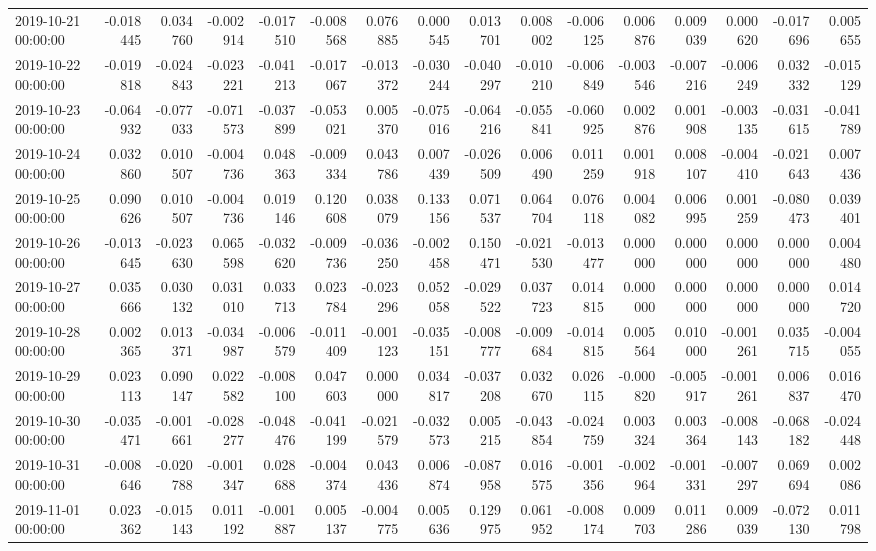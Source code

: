 \begin{tabular}{lrrrrrrrrrrrrrrr}
2019-10-21 00:00:00 & -0.018445 & 0.034760 & -0.002914 & -0.017510 & -0.008568 & 0.076885 & 0.000545 & 0.013701 & 0.008002 & -0.006125 & 0.006876 & 0.009039 & 0.000620 & -0.017696 & 0.005655 \\
2019-10-22 00:00:00 & -0.019818 & -0.024843 & -0.023221 & -0.041213 & -0.017067 & -0.013372 & -0.030244 & -0.040297 & -0.010210 & -0.006849 & -0.003546 & -0.007216 & -0.006249 & 0.032332 & -0.015129 \\
2019-10-23 00:00:00 & -0.064932 & -0.077033 & -0.071573 & -0.037899 & -0.053021 & 0.005370 & -0.075016 & -0.064216 & -0.055841 & -0.060925 & 0.002876 & 0.001908 & -0.003135 & -0.031615 & -0.041789 \\
2019-10-24 00:00:00 & 0.032860 & 0.010507 & -0.004736 & 0.048363 & -0.009334 & 0.043786 & 0.007439 & -0.026509 & 0.006490 & 0.011259 & 0.001918 & 0.008107 & -0.004410 & -0.021643 & 0.007436 \\
2019-10-25 00:00:00 & 0.090626 & 0.010507 & -0.004736 & 0.019146 & 0.120608 & 0.038079 & 0.133156 & 0.071537 & 0.064704 & 0.076118 & 0.004082 & 0.006995 & 0.001259 & -0.080473 & 0.039401 \\
2019-10-26 00:00:00 & -0.013645 & -0.023630 & 0.065598 & -0.032620 & -0.009736 & -0.036250 & -0.002458 & 0.150471 & -0.021530 & -0.013477 & 0.000000 & 0.000000 & 0.000000 & 0.000000 & 0.004480 \\
2019-10-27 00:00:00 & 0.035666 & 0.030132 & 0.031010 & 0.033713 & 0.023784 & -0.023296 & 0.052058 & -0.029522 & 0.037723 & 0.014815 & 0.000000 & 0.000000 & 0.000000 & 0.000000 & 0.014720 \\
2019-10-28 00:00:00 & 0.002365 & 0.013371 & -0.034987 & -0.006579 & -0.011409 & -0.001123 & -0.035151 & -0.008777 & -0.009684 & -0.014815 & 0.005564 & 0.010000 & -0.001261 & 0.035715 & -0.004055 \\
2019-10-29 00:00:00 & 0.023113 & 0.090147 & 0.022582 & -0.008100 & 0.047603 & 0.000000 & 0.034817 & -0.037208 & 0.032670 & 0.026115 & -0.000820 & -0.005917 & -0.001261 & 0.006837 & 0.016470 \\
2019-10-30 00:00:00 & -0.035471 & -0.001661 & -0.028277 & -0.048476 & -0.041199 & -0.021579 & -0.032573 & 0.005215 & -0.043854 & -0.024759 & 0.003324 & 0.003364 & -0.008143 & -0.068182 & -0.024448 \\
2019-10-31 00:00:00 & -0.008646 & -0.020788 & -0.001347 & 0.028688 & -0.004374 & 0.043436 & 0.006874 & -0.087958 & 0.016575 & -0.001356 & -0.002964 & -0.001331 & -0.007297 & 0.069694 & 0.002086 \\
2019-11-01 00:00:00 & 0.023362 & -0.015143 & 0.011192 & -0.001887 & 0.005137 & -0.004775 & 0.005636 & 0.129975 & 0.061952 & -0.008174 & 0.009703 & 0.011286 & 0.009039 & -0.072130 & 0.011798 \\

\end{tabular}

